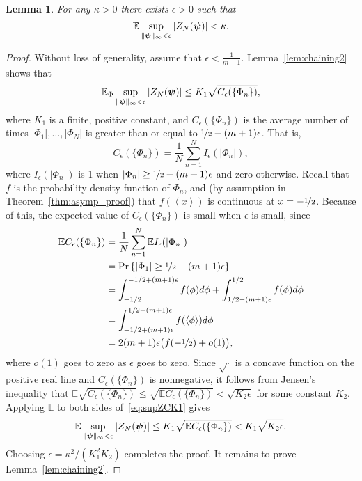 \documentclass[aap]{imsart}
\newcommand{\prob}{\operatorname{Pr}}
\newcommand{\expect}{{\mathbb E}}
\newcommand{\fracpart}[1]{\left\langle #1 \right\rangle}
\newcommand{\abs}[1]{\left\vert #1 \right\vert}
\newtheorem{lemma}{Lemma}
\newcommand{\cubr}[1]{{\left\{ #1 \right\}}}
\begin{document}
\begin{lemma} \label{lem:chaining}
For any $\kappa > 0$ there exists $\epsilon > 0$ such that
\[
\expect \sup_{\|\psibf\|_{\infty} < \epsilon} \abs{ Z_N(\psibf) } < \kappa.
\]
\end{lemma}
\begin{proof}
Without loss of generality, assume that $\epsilon < \frac{1}{m+1}$.  Lemma~\ref{lem:chaining2} shows that
\begin{equation}\label{eq:supZCK1} 
\expect_\Phi \sup_{\|\psibf\|_{\infty} < \epsilon} \abs{ Z_N(\psibf) } \leq K_1 \sqrt{C_\epsilon(\{\Phi_n\})},
\end{equation}
where $K_1$ is a finite, positive constant, and $C_\epsilon(\{\Phi_n\})$ is the average number of times $\abs{\Phi_1}, \dots, \abs{\Phi_N}$ is greater than or equal to $\nicefrac{1}{2} - (m+1)\epsilon$.  That is,
\begin{equation}\label{eq:Cedefn}
C_\epsilon(\{\Phi_n\}) = \frac{1}{N} \sum_{n=1}^{N} I_\epsilon(\abs{\Phi_n}),
\end{equation}
where $I_\epsilon(\abs{\Phi_n})$ is 1 when $\abs{\Phi_n} \geq \nicefrac{1}{2} - (m+1)\epsilon$ and zero otherwise.  Recall that $f$ is the probability density function of $\Phi_n$, and (by assumption in Theorem~\ref{thm:asymp_proof}) that $f(\fracpart{x})$ is continuous at $x = -\nicefrac{1}{2}$.  Because of this, the expected value of $C_\epsilon(\{\Phi_n\})$ is small when $\epsilon$ is small, since
\begin{align*}
\expect C_\epsilon(\{\Phi_n\}) &= \frac{1}{N} \sum_{n=1}^{N} \expect I_\epsilon(\abs{\Phi_n}) \\
&= \prob\cubr{\abs{\Phi_1} \geq \nicefrac{1}{2} - (m+1)\epsilon} \\
&= \int_{-1/2}^{-1/2 + (m+1)\epsilon} f(\phi) d\phi + \int_{1/2 - (m+1)\epsilon}^{1/2} f(\phi) d\phi \\
&= \int_{-1/2 + (m+1)\epsilon}^{1/2 - (m+1)\epsilon} f(\fracpart{\phi}) d\phi \\
&= 2(m+1)\epsilon \big(f(-\nicefrac{1}{2}) + o(1)\big),
\end{align*}
where $o(1)$ goes to zero as $\epsilon$ goes to zero.  Since $\sqrt{\cdot}$ is a concave function on the positive real line and $C_{\epsilon}(\{\Phi_n\})$ is nonnegative, it follows from Jensen's inequality that $\expect \sqrt{C_\epsilon(\{\Phi_n\})} \leq  \sqrt{\expect  C_\epsilon(\{\Phi_n\} )} < \sqrt{K_2 \epsilon }$ for some constant $K_2$.  Applying $\expect$ to both sides of~\eqref{eq:supZCK1} gives
\[
\expect \sup_{\|\psibf\|_{\infty} < \epsilon} \abs{ Z_N(\psibf) } \leq K_1 \sqrt{\expect C_\epsilon(\{\Phi_n\})} < K_1 \sqrt{K_2 \epsilon}.
\]
Choosing $\epsilon = \kappa^2/(K_1^2 K_2)$ completes the proof.  It remains to prove Lemma~\ref{lem:chaining2}.
\end{proof}
\end{document}
